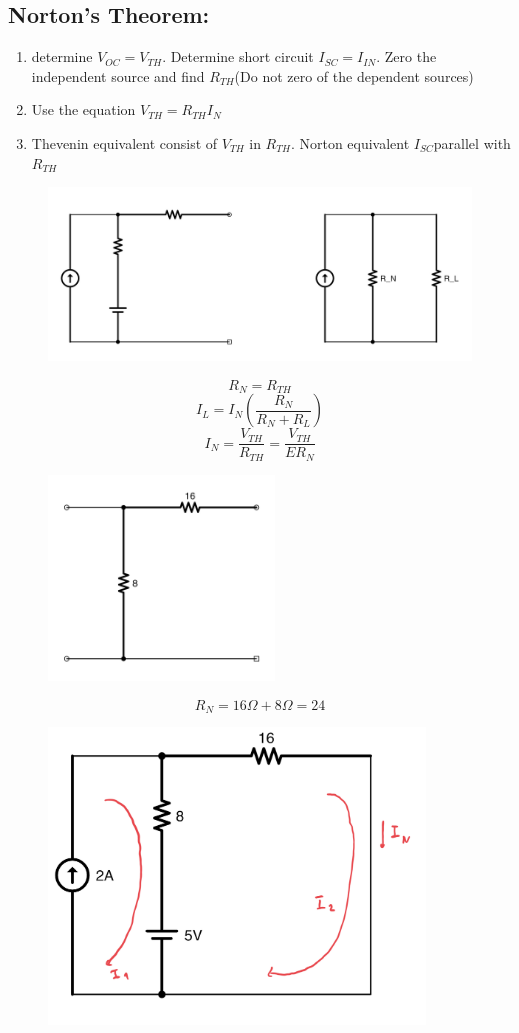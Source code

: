 \documentclass[a4paper,12]{article}
\begin{document}
\subsection{Norton's Theorem:}
\begin{enumerate}
    \item determine $V_{OC}=V_{TH}$. Determine short circuit $I_{SC}=I_{IN}$. Zero the independent source and find $R_{TH}$(Do not zero of the dependent sources)
    \item Use the equation $V_{TH}=R_{TH}I_N$
    \item Thevenin equivalent consist of $V_{TH}$  in $R_{TH}$. Norton equivalent $I_{SC}$parallel with $R_{TH}$
\end{enumerate}
\begin{figure}[H]
    \centering
    \includegraphics[width=130mm]{Image/18.jpg}
\end{figure}
\[R_N=R_{TH}\]
\[I_L=I_N(\frac{R_N}{R_N+R_L})\]
\[I_N=\frac{V_{TH}}{R_{TH}}=\frac{V_{TH}}{ER_N}\]
\begin{figure}[H]
    \centering
    \includegraphics[width=60mm]{Image/19.jpg}
\end{figure}
\[R_N=16 \Omega +8 \Omega=24\]
\begin{figure}[H]
    \centering
    \includegraphics[width=100mm]{Image/20.jpg}
\end{figure}
\end{document}
